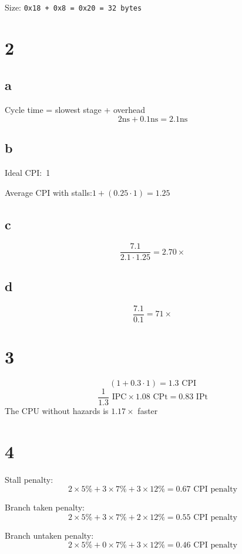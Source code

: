 \documentclass{article}
\begin{document}
\begin{multicols*}{2}
    Size:
    \verb|0x18 + 0x8 = 0x20 = 32 bytes|

    \section*{2}
    \subsection*{a}
    Cycle time = slowest stage + overhead
    \[
        2\si{\nano\second} + 0.1 \si{\nano\second} = 2.1 \si{\nano\second}
    \]
    \subsection*{b}

    Ideal CPI:~1

    Average CPI with stalls:\(1 + (0.25 \cdot 1 ) = 1.25\)

    \subsection*{c}
    \[
        \frac{7.1}{2.1 \cdot 1.25} = 2.70\times
    \]

    \subsection*{d}
    \[
        \frac{7.1}{0.1} = 71\times
    \]

    \section*{3}
    \[(1+0.3\cdot 1) = 1.3 \text{ CPI}\]
    \[\frac{1}{1.3} \text{ IPC} \times 1.08 \text{ CPt} = 0.83 \text{ IPt}\]
    The CPU without hazards is \(1.17\times\) faster

    \section*{4}
    Stall penalty:
    \[
        2\times 5\% + 3 \times 7\% + 3\times 12\% = 0.67 \text{ CPI penalty}
    \]

    Branch taken penalty:
    \[
        2\times 5\% + 3 \times 7\% + 2\times 12\% = 0.55 \text{ CPI penalty}
    \]

    Branch untaken penalty:
    \[
        2\times 5\% + 0 \times 7\% + 3\times 12\% = 0.46 \text{ CPI penalty}
    \]


\end{multicols*}
\end{document}
